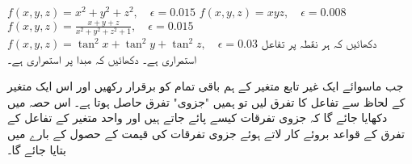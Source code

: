 $f(x,y,z)=x^2+y^2+z^2,\quad \epsilon=0.015$
$f(x,y,z)=xyz,\quad \epsilon=0.008$
$f(x,y,z)=\frac{x+y+z}{x^2+y^2+z^2+1},\quad \epsilon=0.015$
$f(x,y,z)=\tan^2x+\tan^2y+\tan^2z,\quad \epsilon=0.03$
دکھائیں کہ ہر نقطہ   پر تفاعل  استمراری ہے۔ 
دکھائیں کہ مبدا پر  استمراری ہے۔


جب  ماسوائے ایک غیر تابع متغیر کے ہم باقی تمام  کو برقرار رکھیں اور اس ایک متغیر کے لحاظ سے تفاعل کا تفرق لیں تو ہمیں "جزوی" تفرق حاصل ہوتا ہے۔ اس حصہ میں دکھایا جائے گا کہ جزوی تفرقات کیسے  پائے جاتے ہیں اور واحد متغیر کے تفاعل کے تفرق کے قواعد بروئے کار لاتے ہوئے   جزوی تفرقات   کی قیمت کے حصول کے بارے میں بتایا جائے گا۔

